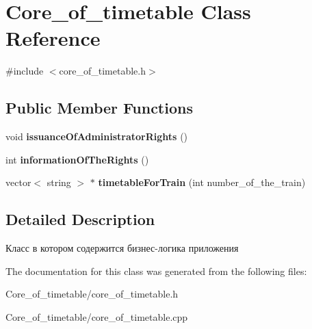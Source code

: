 \hypertarget{class_core__of__timetable}{}\section{Core\+\_\+of\+\_\+timetable Class Reference}
\label{class_core__of__timetable}


{\ttfamily \#include $<$core\+\_\+of\+\_\+timetable.\+h$>$}

\subsection*{Public Member Functions}
\begin{DoxyCompactItemize}
\item 
void {\bfseries issuance\+Of\+Administrator\+Rights} ()\hypertarget{class_core__of__timetable_a9ec4d33c0d66d515f22e56653a2c77ea}{}\label{class_core__of__timetable_a9ec4d33c0d66d515f22e56653a2c77ea}

\item 
int {\bfseries information\+Of\+The\+Rights} ()\hypertarget{class_core__of__timetable_a51ce39ebdcd1d1e072cd06f145aa94a0}{}\label{class_core__of__timetable_a51ce39ebdcd1d1e072cd06f145aa94a0}

\item 
vector$<$ string $>$ $\ast$ {\bfseries timetable\+For\+Train} (int number\+\_\+of\+\_\+the\+\_\+train)\hypertarget{class_core__of__timetable_aa96d8324770692f0aa814d3c8210fc4a}{}\label{class_core__of__timetable_aa96d8324770692f0aa814d3c8210fc4a}

\end{DoxyCompactItemize}


\subsection{Detailed Description}
Класс в котором содержится бизнес-\/логика приложения 

The documentation for this class was generated from the following files\+:\begin{DoxyCompactItemize}
\item 
Core\+\_\+of\+\_\+timetable/core\+\_\+of\+\_\+timetable.\+h\item 
Core\+\_\+of\+\_\+timetable/core\+\_\+of\+\_\+timetable.\+cpp\end{DoxyCompactItemize}
